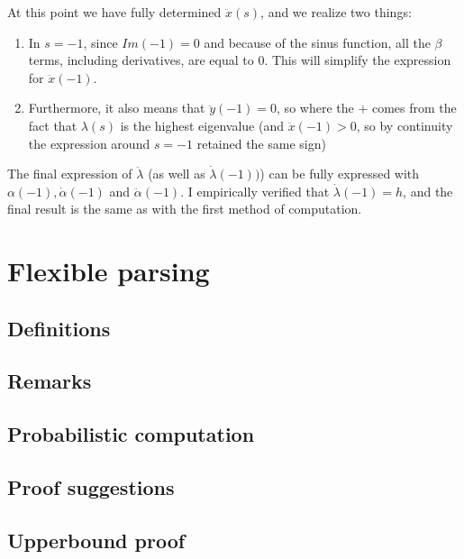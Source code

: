 \begin{appendices}
At this point we have fully determined $\ddot{{x}}(s)$, and we realize two things:

\begin{enumerate}
    \item In $s=-1$, since $Im(-1) =0$ and because of the sinus function,
          all the $\beta$ terms, including derivatives, are equal to 0.
          This will simplify the expression for $\ddot{{x}}(-1)$.

    \item Furthermore, it also means that $\ddot{{y}}(-1) = 0$,
          so
          where the $+$ comes from the fact that $\lambda(s)$ is 
          the highest eigenvalue (and $\ddot{{x}}(-1) > 0$, so by
          continuity the expression around $s=-1$ retained the same sign)
\end{enumerate}

The final expression of $\ddot{{\lambda}}$ (as well as $\dot{\lambda}(-1))$)
can be fully expressed with $\alpha(-1), \dot{\alpha}(-1)$ and $\ddot{{\alpha}}(-1)$.
I empirically verified that $\dot{\lambda}(-1) = h$, and the final result is the same
as with the first method of computation.


% 

\newpage
\section{Flexible parsing}
\label{app:flexible}

\subsection{Definitions}


\subsection{Remarks}


\subsection{Probabilistic computation}


\subsection{Proof suggestions}


\subsection{Upperbound proof}



\end{appendices}